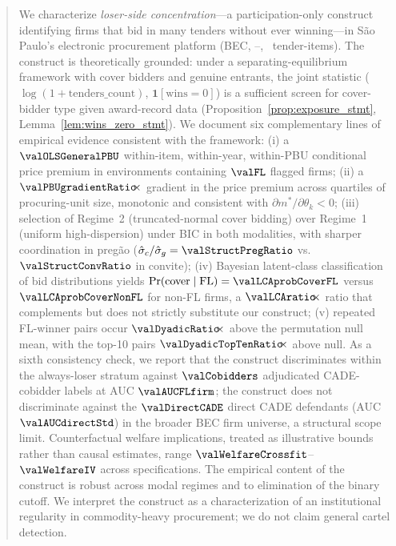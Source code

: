 \begin{frontmatter}
\begin{abstract}
We characterize \emph{loser-side concentration}---a participation-only
construct identifying firms that bid in many tenders without ever
winning---in São Paulo's electronic procurement platform (BEC,
\valYearStart--\valYearEnd, \valBECitems\ tender-items). The
construct is theoretically grounded: under a separating-equilibrium
framework with cover bidders and genuine entrants, the joint
statistic ($\log(1{+}\text{tenders\_count})$, $\mathbf{1}[\text{wins}=0]$)
is a sufficient screen for cover-bidder type given award-record data
(Proposition~\ref{prop:exposure_stmt}, Lemma~\ref{lem:wins_zero_stmt}).
We document six complementary lines of empirical evidence consistent
with the framework: (i) a $\valOLSGeneralPBU$ within-item, within-year, within-PBU conditional price premium
in environments containing $\valFL$ flagged firms; (ii) a
$\valPBUgradientRatio\!\!\times$ gradient in the price premium across
quartiles of procuring-unit size, monotonic and consistent with
$\partial m^*/\partial \theta_k < 0$; (iii) selection of Regime~2
(truncated-normal cover bidding) over Regime~1 (uniform high-dispersion)
under BIC in both modalities, with sharper coordination in pregão
($\hat{\sigma}_c/\hat{\sigma}_g = \valStructPregRatio$ vs.\ $\valStructConvRatio$
in convite); (iv) Bayesian latent-class classification of
bid distributions yields $\Pr(\text{cover} \mid \text{FL}) = \valLCAprobCoverFL$
versus $\valLCAprobCoverNonFL$ for non-FL firms, a $\valLCAratio\!\!\times$
ratio that complements but does not strictly substitute our construct; (v) repeated FL-winner
pairs occur $\valDyadicRatio\!\!\times$ above the permutation
null mean, with the top-10 pairs $\valDyadicTopTenRatio\!\!\times$
above null. As a sixth consistency check, we report that the
construct discriminates within the always-loser stratum against
$\valCobidders$ adjudicated CADE-cobidder labels at AUC $\valAUCFLfirm$;
the construct does not discriminate against the $\valDirectCADE$
direct CADE defendants (AUC $\valAUCdirectStd$) in the broader BEC
firm universe, a structural scope limit. Counterfactual welfare
implications, treated as illustrative bounds rather than causal
estimates, range $\valWelfareCrossfit$--$\valWelfareIV$ across
specifications. The empirical content of the construct is robust
across modal regimes and to elimination of the binary cutoff. We
interpret the construct as a characterization of an institutional
regularity in commodity-heavy procurement; we do not claim general
cartel detection.
\end{abstract}

\end{frontmatter}

